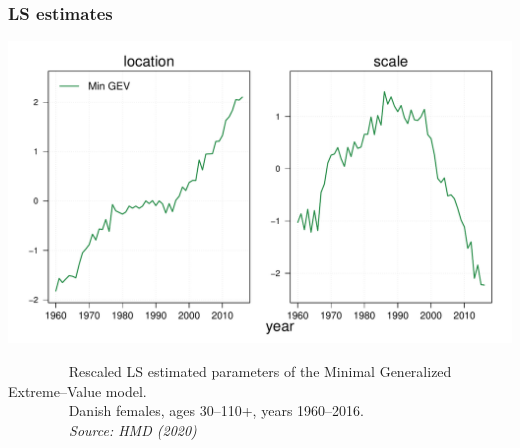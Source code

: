 \documentclass[12pt, xcolor=table]{beamer}  %
\begin{document}
\begin{frame}[noframenumbering]
\end{frame}

\begin{frame}[noframenumbering]
\frametitle{LS estimates}
\vspace{-0.25cm}
\begin{center}
\includegraphics[scale=0.45]{Figures/Ch1/F4_a}
\end{center}
\vspace{-0.3cm}
\tiny{$\quad\quad\quad\quad$ Rescaled LS estimated parameters of the Minimal Generalized Extreme--Value model.\\ $\quad\quad\quad\quad$ Danish females, ages 30--110+, years 1960--2016. \\ \emph{$\quad\quad\quad\quad$ Source: HMD (2020)}} \\

\end{frame}
\end{document}
